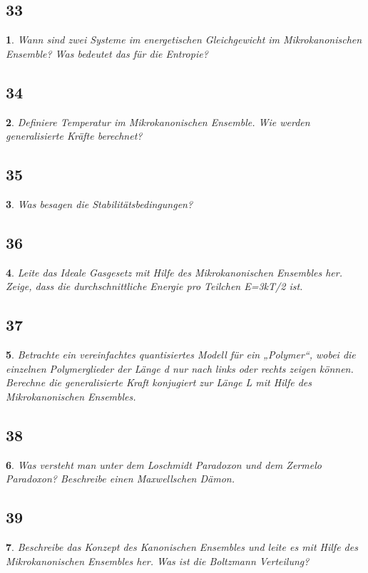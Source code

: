 \documentclass[12pt,a4paper]{report}
\newtheorem{myfrag}{}%
\begin{document}
\subsection{33}
\begin{myfrag}
Wann sind zwei Systeme im energetischen Gleichgewicht im Mikrokanonischen
Ensemble? Was bedeutet das für die Entropie?
\end{myfrag}
\subsection{34}
\begin{myfrag}
Definiere Temperatur im Mikrokanonischen Ensemble. Wie werden
generalisierte Kräfte berechnet?
\end{myfrag}
\subsection{35}
\begin{myfrag}
Was besagen die Stabilitätsbedingungen?
\end{myfrag}
\subsection{36}
\begin{myfrag}
Leite das Ideale Gasgesetz mit Hilfe des Mikrokanonischen Ensembles her.
Zeige, dass die durchschnittliche Energie pro Teilchen E=3kT/2 ist.
\end{myfrag}
\subsection{37}
\begin{myfrag}
Betrachte ein vereinfachtes quantisiertes Modell für ein „Polymer“, wobei die
einzelnen Polymerglieder der Länge d nur nach links oder rechts zeigen können.
Berechne die generalisierte Kraft konjugiert zur Länge L mit Hilfe des
Mikrokanonischen Ensembles.
\end{myfrag}
\subsection{38}
\begin{myfrag}
Was versteht man unter dem Loschmidt Paradoxon und dem Zermelo Paradoxon?
Beschreibe einen Maxwellschen Dämon.
\end{myfrag}
\subsection{39}
\begin{myfrag}
Beschreibe das Konzept des Kanonischen Ensembles und leite es mit Hilfe des
Mikrokanonischen Ensembles her. Was ist die Boltzmann Verteilung?
\end{myfrag}
\end{document}
